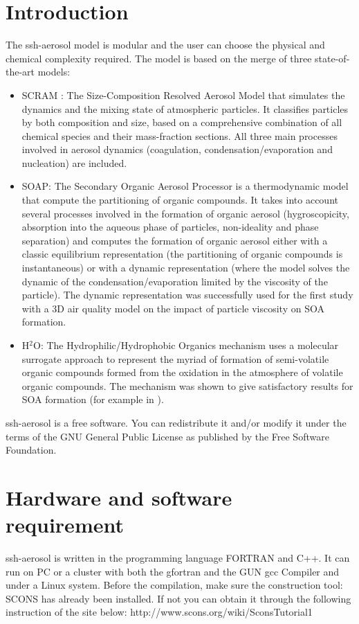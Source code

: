 \documentclass[a4paper,11pt]{article}
\begin{document}
\section{Introduction}
The ssh-aerosol model is modular and the user can choose the physical and chemical complexity required.
The model is based on the merge of three state-of-the-art models:
\begin{itemize}
\item SCRAM : The Size-Composition Resolved Aerosol Model \cite{zhu2015size} that simulates the dynamics and the mixing state of atmospheric particles. It classifies particles by both composition and size, based on a comprehensive combination of all chemical species and their mass-fraction sections. All three main processes involved in aerosol dynamics (coagulation, condensation/evaporation and nucleation) are included.
\item SOAP: The Secondary Organic Aerosol Processor \cite{couvidat2015secondary} is a thermodynamic model that compute the partitioning of organic compounds. It takes into account several processes involved in the formation of organic aerosol (hygroscopicity, absorption into the aqueous phase of particles, non-ideality and phase separation) and computes the formation of organic aerosol either with a classic equilibrium representation (the partitioning of organic compounds is instantaneous) or with a dynamic representation (where the model solves the dynamic of the condensation/evaporation limited by the viscosity of the particle). The dynamic representation was successfully used \cite{kim2019modeling} for the first study with a 3D air quality model on the impact of particle viscosity on SOA formation.
\item H$^2$O: The Hydrophilic/Hydrophobic Organics \cite{couvidat2012hydrophilic} mechanism uses a molecular surrogate approach to represent the myriad of formation of semi-volatile organic compounds formed from the oxidation in the atmosphere of volatile organic compounds. The mechanism was shown to give satisfactory results for SOA formation (for example in \cite{kim2019modeling}).
\end{itemize}

ssh-aerosol is a free software. You can redistribute it and/or modify it under the terms of the GNU General Public License as published by the Free Software Foundation.
\section*{Hardware and software requirement}
ssh-aerosol is written in the programming language FORTRAN and C++. It can run on PC or a cluster with both the gfortran and the GUN gcc Compiler and under a Linux system. Before the compilation, make sure the construction tool: SCONS has already been installed.
If not you can obtain it through the following instruction of the site below:
http://www.scons.org/wiki/SconsTutorial1
\end{document}
